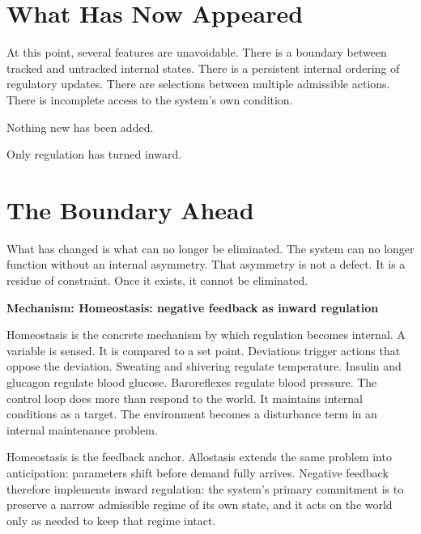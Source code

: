 \documentclass[11pt,twoside,openright]{book}
\newenvironment{mechanismbox}[1]
  {\begin{framed}\noindent\textbf{Mechanism: #1}\par\medskip}
  {\end{framed}}
\begin{document}
\section*{What Has Now Appeared}

At this point, several features are unavoidable. There is a boundary between tracked and untracked internal states. There is a persistent internal ordering of regulatory updates. There are selections between multiple admissible actions. There is incomplete access to the system's own condition.

Nothing new has been added.

Only regulation has turned inward.

\section*{The Boundary Ahead}

What has changed is what can no longer be eliminated. The system can no longer function without an internal asymmetry. That asymmetry is not a defect. It is a residue of constraint. Once it exists, it cannot be eliminated.

\begin{mechanismbox}{Homeostasis: negative feedback as inward regulation}

Homeostasis is the concrete mechanism by which regulation becomes internal. A variable is sensed. It is compared to a set point. Deviations trigger actions that oppose the deviation. Sweating and shivering regulate temperature. Insulin and glucagon regulate blood glucose. Baroreflexes regulate blood pressure. The control loop does more than respond to the world. It maintains internal conditions as a target. The environment becomes a disturbance term in an internal maintenance problem.

Homeostasis is the feedback anchor. Allostasis extends the same problem into anticipation: parameters shift before demand fully arrives. Negative feedback therefore implements inward regulation: the system's primary commitment is to preserve a narrow admissible regime of its own state, and it acts on the world only as needed to keep that regime intact.

\end{mechanismbox}
\end{document}
